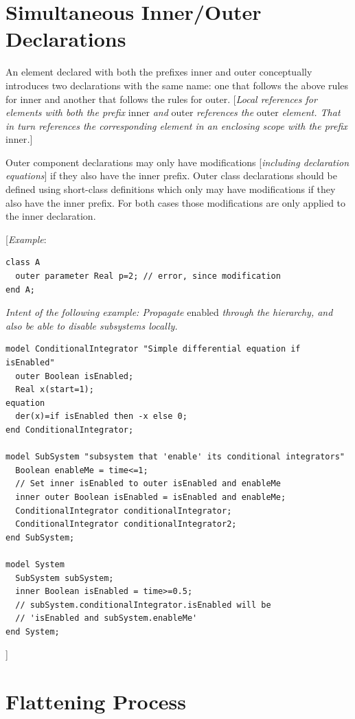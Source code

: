 \documentclass[10pt,a4paper]{report}
\def\doublelabel#1{\label{#1}}
\begin{document}
\section{Simultaneous Inner/Outer Declarations}\doublelabel{simultaneous-inner-outer-declarations}

An element declared with both the prefixes inner and outer conceptually
introduces two declarations with the same name: one that follows the
above rules for inner and another that follows the rules for outer.
{[}\emph{Local references for elements with both the prefix} inner
\emph{and} outer \emph{references the} outer \emph{element. That in turn
references the corresponding element in an enclosing scope with the
prefix} inner\emph{.}{]}

Outer component declarations may only have modifications
{[}\emph{including declaration equations}{]} if they also have the inner
prefix. Outer class declarations should be defined using short-class
definitions which only may have modifications if they also have the
inner prefix. For both cases those modifications are only applied to the
inner declaration.

{[}\emph{Example}:
\begin{lstlisting}[language=modelica]
class A
  outer parameter Real p=2; // error, since modification
end A;
\end{lstlisting}

\emph{Intent of the following example: Propagate} enabled \emph{through
the hierarchy, and also be able to disable subsystems locally.}
\begin{lstlisting}[language=modelica]
model ConditionalIntegrator "Simple differential equation if isEnabled"
  outer Boolean isEnabled;
  Real x(start=1);
equation
  der(x)=if isEnabled then -x else 0;
end ConditionalIntegrator;

model SubSystem "subsystem that 'enable' its conditional integrators"
  Boolean enableMe = time<=1;
  // Set inner isEnabled to outer isEnabled and enableMe
  inner outer Boolean isEnabled = isEnabled and enableMe;
  ConditionalIntegrator conditionalIntegrator;
  ConditionalIntegrator conditionalIntegrator2;
end SubSystem;

model System
  SubSystem subSystem;
  inner Boolean isEnabled = time>=0.5;
  // subSystem.conditionalIntegrator.isEnabled will be
  // 'isEnabled and subSystem.enableMe'
end System;
\end{lstlisting}
{]}

\section{Flattening Process}\doublelabel{flattening-process}
\end{document}
